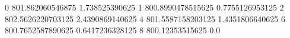 0 801.862060546875 1.738525390625
1 800.8990478515625 0.7755126953125
2 802.5626220703125 2.4390869140625
4 801.5587158203125 1.4351806640625
6 800.7652587890625 0.6417236328125
8 800.12353515625 0.0

